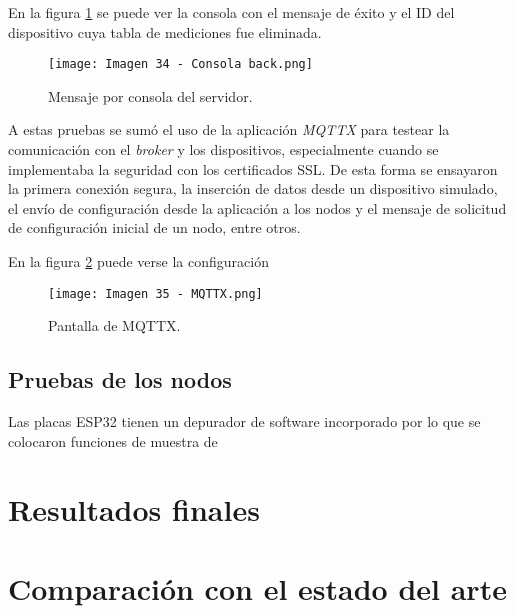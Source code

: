 En la figura \ref{fig:34} se puede ver la consola con el mensaje de éxito y el ID del dispositivo cuya tabla de mediciones fue eliminada.

\begin{figure}[h]
\centering
\texttt{[image: Imagen 34 - Consola back.png]}
\caption[Prueba backend]{Mensaje por consola del servidor.}
\label{fig:34}
\end{figure}

A estas pruebas se sumó el uso de la aplicación \textit{MQTTX} para testear la comunicación con el \textit{broker} y los dispositivos, especialmente cuando se implementaba la seguridad con los certificados SSL. De esta forma se ensayaron la primera conexión segura, la inserción de datos desde un dispositivo simulado, el envío de configuración desde la aplicación a los nodos y el mensaje de solicitud de configuración inicial de un nodo, entre otros.

En la figura \ref{fig:35} puede verse la configuración

\begin{figure}[h]
\centering
\texttt{[image: Imagen 35 - MQTTX.png]}
\caption[MQTTX]{Pantalla de MQTTX.}
\label{fig:35}
\end{figure}

\subsection{Pruebas de los nodos}

Las placas ESP32 tienen un depurador de software incorporado por lo que se colocaron funciones de muestra de

\section{Resultados finales}



\section{Comparación con el estado del arte}